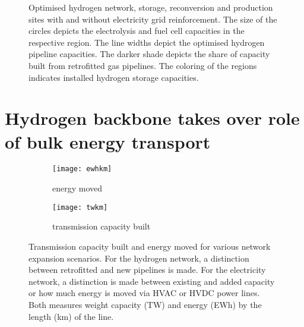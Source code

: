 \begin{figure}
    \centering
     \caption{Optimised hydrogen network, storage, reconversion and production sites with and
    without electricity grid reinforcement. The size of the circles depicts the
    electrolysis and fuel cell capacities in the respective region. The line
    widths depict the optimised hydrogen pipeline capacities. The darker shade
    depicts the share of capacity built from retrofitted gas pipelines. The
    coloring of the regions indicates installed hydrogen storage capacities.}
    \label{fig:h2-network}
\end{figure}




\section*{Hydrogen backbone takes over role of bulk energy transport}
\label{sec:energy-moved}

\begin{figure}
    \centering
        \begin{subfigure}[t]{0.49\textwidth}
            \centering
            \caption{energy moved}
            \texttt{[image: ewhkm]}
            \label{fig:network-stats:ewhkm}
        \end{subfigure}
        \begin{subfigure}[t]{0.49\textwidth}
            \centering
            \caption{transmission capacity built}
            \texttt{[image: twkm]}
            \label{fig:network-stats:twkm}
        \end{subfigure}
    \caption{Transmission capacity built and energy moved for various network
        expansion scenarios. For the hydrogen network, a distinction between
        retrofitted and new pipelines is made. For the electricity network, a
        distinction is made between existing and added capacity or how much
        energy is moved via HVAC or HVDC power lines. Both measures weight
        capacity (TW) and energy (EWh) by the length (km) of the line.}
    \label{fig:network-stats}
\end{figure}

